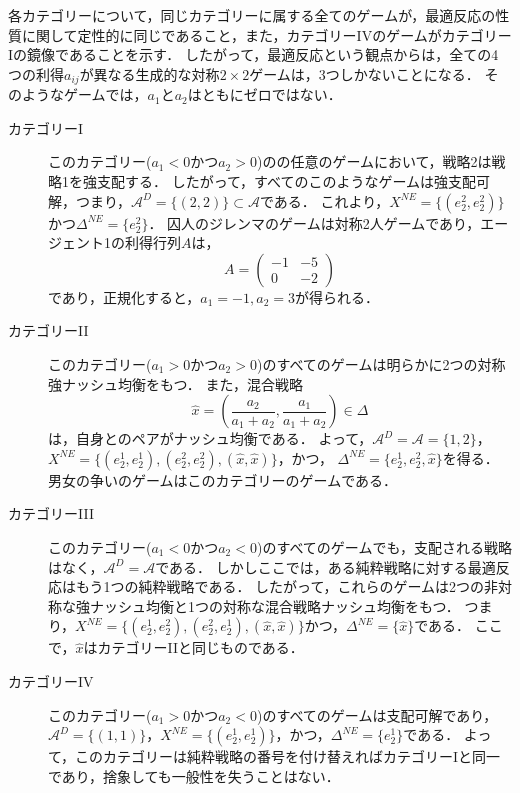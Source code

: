 \documentclass{jsreport}
\begin{document}
各カテゴリーについて，同じカテゴリーに属する全てのゲームが，最適反応の性質に関して定性的に同じであること，また，カテゴリーIVのゲームがカテゴリーIの鏡像であることを示す．
したがって，最適反応という観点からは，全ての4つの利得$a_{ij}$が異なる生成的な対称$2 \times 2$ゲームは，3つしかないことになる．
そのようなゲームでは，$a_1$と$a_2$はともにゼロではない．

\begin{description}
  \item[カテゴリーI]
  このカテゴリー($a_1 < 0$かつ$a_2 > 0$)のの任意のゲームにおいて，戦略2は戦略1を強支配する．
  したがって，すべてのこのようなゲームは強支配可解，つまり，$\mathcal{A}^D = \{(2, 2)\} \subset \mathcal{A}$である．
  これより，$X^{NE} = \{(e_2^2, e_2^2)\}$かつ$\Delta^{NE} = \{e_2^2\}$．
  囚人のジレンマのゲームは対称2人ゲームであり，エージェント1の利得行列$A$は，
  \begin{equation}
    A = \left(
    \begin{array}{cc}
      -1 & -5 \\
      0 & -2
    \end{array}
    \right) \nonumber
  \end{equation}
  であり，正規化すると，$a_1 = -1, a_2 = 3$が得られる．

  \item[カテゴリーII]
  このカテゴリー($a_1 > 0$かつ$a_2 > 0$)のすべてのゲームは明らかに2つの対称強ナッシュ均衡をもつ．
  また，混合戦略
  \begin{equation}
    \hat{x} = \left(\frac{a_2}{a_1 + a_2}, \frac{a_1}{a_1 + a_2}\right) \in \Delta \nonumber
  \end{equation}
  は，自身とのペアがナッシュ均衡である．
  よって，$\mathcal{A}^D = \mathcal{A} = \{1, 2\}$，
  $X^{NE} = \{(e_2^1, e_2^1), (e_2^2, e_2^2), (\hat{x}, \hat{x})\}$，かつ，
  $\Delta^{NE} = \{e_2^1, e_2^2, \hat{x}\}$を得る．
  男女の争いのゲームはこのカテゴリーのゲームである．

  \item[カテゴリーIII]
  このカテゴリー($a_1 < 0$かつ$a_2 < 0$)のすべてのゲームでも，支配される戦略はなく，$\mathcal{A}^D = \mathcal{A}$である．
  しかしここでは，ある純粋戦略に対する最適反応はもう1つの純粋戦略である．
  したがって，これらのゲームは2つの非対称な強ナッシュ均衡と1つの対称な混合戦略ナッシュ均衡をもつ．
  つまり，$X^{NE} = \{(e_2^1, e_2^2), (e_2^2, e_2^1), (\hat{x}, \hat{x})\}$かつ，$\Delta^{NE} = \{\hat{x}\}$である．
  ここで，$\hat{x}$はカテゴリーIIと同じものである．

  \item[カテゴリーIV]
  このカテゴリー($a_1 > 0$かつ$a_2 < 0$)のすべてのゲームは支配可解であり，$\mathcal{A}^D = \{(1, 1)\}$，$X^{NE} = \{(e_2^1, e_2^1)\}$，かつ，$\Delta^{NE} = \{e_2^1\}$である．
  よって，このカテゴリーは純粋戦略の番号を付け替えればカテゴリーIと同一であり，捨象しても一般性を失うことはない．
\end{description}
\end{document}
